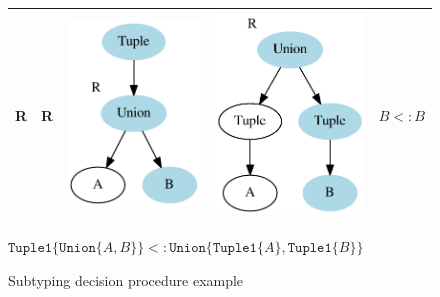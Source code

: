 \documentclass[a4paper,english]{lipics-v2018}
\newcommand{\xt}[1]{\texttt{#1}}
\newcommand{\tupleo}[1]{\xt{Tuple1\{}#1\xt{\}}}
\newcommand{\union}[2]{\xt{Union\{}#1,#2\xt{\}}}
\newcommand{\goodcell}{\cellcolor{green!25}}
\begin{document}
\begin{figure}
\begin{tabular}{cc|cc|c}
\goodcell R & \goodcell R & \goodcell \includegraphics[scale=0.3]{figures-gen/left2.pdf} & \goodcell \includegraphics[scale=0.3]{figures-gen/right2.pdf}  
    & \goodcell ${B} <: {B}$ \\
\hline
\end{tabular}

\hspace{1em}

$\tupleo{\union{A}{B}} <: \union{\tupleo{A}}{\tupleo{B}}$

\caption{Subtyping decision procedure example}
\label{fig:cfs}
\end{figure}
\end{document}
